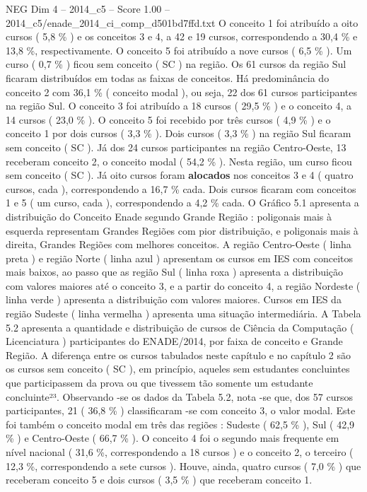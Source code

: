 \begin{textsample}{NEG Dim 4 – 2014\_c5 – Score 1.00 – 2014\_c5/enade\_2014\_ci\_comp\_d501bd7ffd.txt}
O conceito 1 foi atribuído a oito cursos ( 5,8 \% ) e os conceitos 3 e 4, a 42 e 19 cursos, correspondendo a 30,4 \% e 13,8 \%, respectivamente.
O conceito 5 foi atribuído a nove cursos ( 6,5 \% ).
Um curso ( 0,7 \% ) ficou sem conceito ( SC ) na região.
Os 61 cursos da região Sul ficaram distribuídos em todas as faixas de conceitos.
Há predominância do conceito 2 com 36,1 \% ( conceito modal ), ou seja, 22 dos 61 cursos participantes na região Sul.
O conceito 3 foi atribuído a 18 cursos ( 29,5 \% ) e o conceito 4, a 14 cursos ( 23,0 \% ).
O conceito 5 foi recebido por três cursos ( 4,9 \% ) e o conceito 1 por dois cursos ( 3,3 \% ).
Dois cursos ( 3,3 \% ) na região Sul ficaram sem conceito ( SC ).
Já dos 24 cursos participantes na região Centro-Oeste, 13 receberam conceito 2, o conceito modal ( 54,2 \% ).
Nesta região, um curso ficou sem conceito ( SC ).
Já oito cursos foram \textbf{alocados} nos conceitos 3 e 4 ( quatro cursos, cada ), correspondendo a 16,7 \% cada.
Dois cursos ficaram com conceitos 1 e 5 ( um curso, cada ), correspondendo a 4,2 \% cada.
O Gráfico 5.1 apresenta a distribuição do Conceito Enade segundo Grande Região : poligonais mais à esquerda representam Grandes Regiões com pior distribuição, e poligonais mais à direita, Grandes Regiões com melhores conceitos.
A região Centro-Oeste ( linha preta ) e região Norte ( linha azul ) apresentam os cursos em IES com conceitos mais baixos, ao passo que as região Sul ( linha roxa ) apresenta a distribuição com valores maiores até o conceito 3, e a partir do conceito 4, a região Nordeste ( linha verde ) apresenta a distribuição com valores maiores.
Cursos em IES da região Sudeste ( linha vermelha ) apresenta uma situação intermediária.
A Tabela 5.2 apresenta a quantidade e distribuição de cursos de Ciência da Computação ( Licenciatura ) participantes do ENADE/2014, por faixa de conceito e Grande Região.
A diferença entre os cursos tabulados neste capítulo e no capítulo 2 são os cursos sem conceito ( SC ), em princípio, aqueles sem estudantes concluintes que participassem da prova ou que tivessem tão somente um estudante concluinte²³.
Observando -se os dados da Tabela 5.2, nota -se que, dos 57 cursos participantes, 21 ( 36,8 \% ) classificaram -se com conceito 3, o valor modal.
Este foi também o conceito modal em três das regiões : Sudeste ( 62,5 \% ), Sul ( 42,9 \% ) e Centro-Oeste ( 66,7 \% ).
O conceito 4 foi o segundo mais frequente em nível nacional ( 31,6 \%, correspondendo a 18 cursos ) e o conceito 2, o terceiro ( 12,3 \%, correspondendo a sete cursos ).
Houve, ainda, quatro cursos ( 7,0 \% ) que receberam conceito 5 e dois cursos ( 3,5 \% ) que receberam conceito 1.

\end{textsample}
